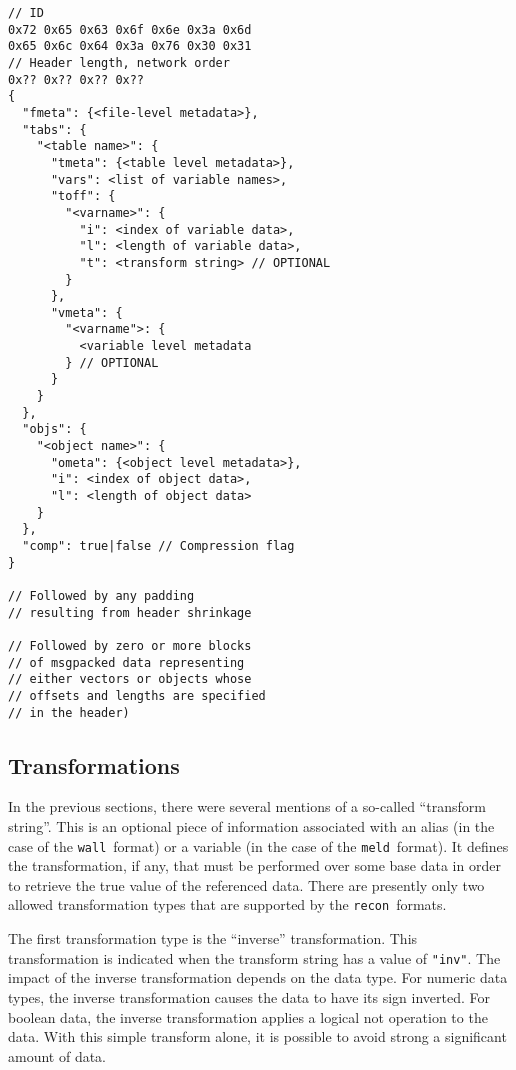 \documentclass[11pt,a4paper,twocolumn]{article}
\newcommand{\recon}{\texttt{recon}}
\newcommand{\wall}{\texttt{wall}}
\newcommand{\meld}{\texttt{meld}}
\newcommand{\code}[1]{\texttt{#1}} %
\begin{document}
\begin{verbatim}
// ID
0x72 0x65 0x63 0x6f 0x6e 0x3a 0x6d
0x65 0x6c 0x64 0x3a 0x76 0x30 0x31
// Header length, network order
0x?? 0x?? 0x?? 0x??
{
  "fmeta": {<file-level metadata>},
  "tabs": {
    "<table name>": {
      "tmeta": {<table level metadata>},
      "vars": <list of variable names>,
      "toff": {
        "<varname>": {
          "i": <index of variable data>,
          "l": <length of variable data>,
          "t": <transform string> // OPTIONAL
        }
      },
      "vmeta": {
        "<varname">: {
          <variable level metadata
        } // OPTIONAL
      }
    }
  },
  "objs": {
    "<object name>": {
      "ometa": {<object level metadata>},
      "i": <index of object data>,
      "l": <length of object data>
    }
  },
  "comp": true|false // Compression flag
}

// Followed by any padding
// resulting from header shrinkage

// Followed by zero or more blocks
// of msgpacked data representing
// either vectors or objects whose
// offsets and lengths are specified
// in the header)
\end{verbatim}

\subsection{Transformations}
\label{sec:trans}


In the previous sections, there were several mentions of a so-called
``transform string''.  This is an optional piece of information
associated with an alias (in the case of the \wall\ format) or a
variable (in the case of the \meld\ format).  It defines the
transformation, if any, that must be performed over some base data in
order to retrieve the true value of the referenced data.  There are
presently only two allowed transformation types that are supported by
the \recon\ formats.

The first transformation type is the ``inverse'' transformation.  This
transformation is indicated when the transform string has a value of
\code{"inv"}.  The impact of the inverse transformation depends on the
data type.  For numeric data types, the inverse transformation causes
the data to have its sign inverted.  For boolean data, the inverse
transformation applies a logical not operation to the data.  With this
simple transform alone, it is possible to avoid strong a significant
amount of data.
\end{document}
